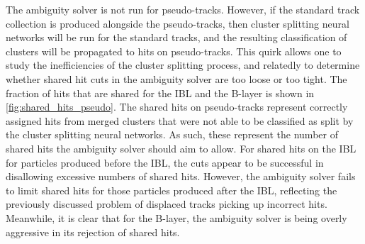 The ambiguity solver is not run for pseudo-tracks.
However, if the standard track collection is produced alongside the pseudo-tracks, then cluster splitting neural networks will be run for the standard tracks, and the resulting classification of clusters will be propagated to hits on pseudo-tracks.
This quirk allows one to study the inefficiencies of the cluster splitting process, and relatedly to determine whether shared hit cuts in the ambiguity solver are too loose or too tight.
The fraction of hits that are shared for the IBL and the B-layer is shown in \cref{fig:shared_hits_pseudo}.
The shared hits on pseudo-tracks represent correctly assigned hits from merged clusters that were not able to be classified as split by the cluster splitting neural networks.
As such, these represent the number of shared hits the ambiguity solver should aim to allow.
For shared hits on the IBL for particles produced before the IBL, the cuts appear to be successful in disallowing excessive numbers of shared hits.
However, the ambiguity solver fails to limit shared hits for those particles produced after the IBL, reflecting the previously discussed problem of displaced tracks picking up incorrect hits.
Meanwhile, it is clear that for the B-layer, the ambiguity solver is being overly aggressive in its rejection of shared hits.

